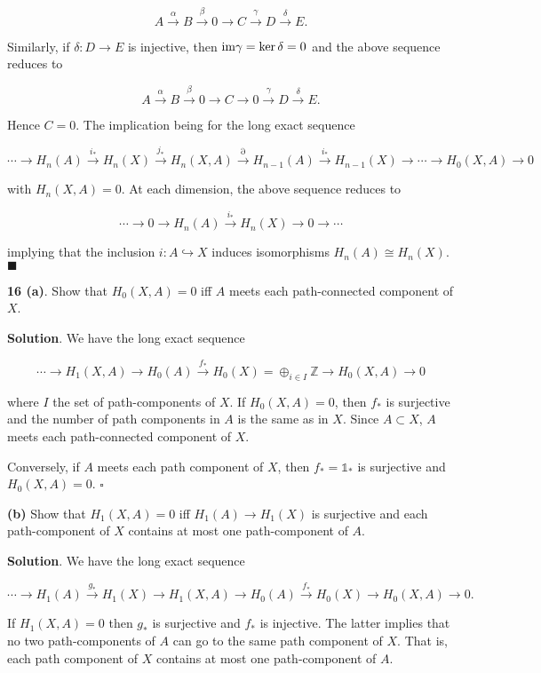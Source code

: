 \documentclass{article}
\newcommand{\Z}{\mathbb{Z}}
\newcommand{\identity}{\mathds{1}}
\newcommand{\im}{\textnormal{im}}
\begin{document}
$$A\xrightarrow{\alpha} B\xrightarrow{\beta} 0\to C\xrightarrow{\gamma} D\xrightarrow{\delta} E.$$

Similarly, if $\delta: D\to E$ is injective, then $\im \gamma = \ker \delta = 0$ and the above sequence reduces to

$$A\xrightarrow{\alpha} B\xrightarrow{\beta} 0\to C\to 0\xrightarrow{\gamma} D\xrightarrow{\delta} E.$$

Hence $C = 0$. The implication being for the long exact sequence

$$\cdots \to H_{n}(A)\xrightarrow{i_{\ast}} H_{n}(X)\xrightarrow{j_{\ast}}H_{n}(X, A)\xrightarrow{\partial} H_{n-1}(A)\xrightarrow{i_{\ast}} H_{n-1}(X)\to \cdots \to H_{0}(X, A)\to 0$$

with $H_{n}(X, A) = 0$. At each dimension, the above sequence reduces to

$$\cdots\to  0\to H_{n}(A)\xrightarrow{i_{\ast}} H_{n}(X)\to 0\to \cdots $$

implying that the inclusion $i: A\hookrightarrow X$ induces isomorphisms $H_{n}(A)\cong H_{n}(X)$. $\blacksquare$
\bigskip
\bigskip

\textbf{16 (a)}. Show that $H_{0}(X, A) = 0$ iff $A$ meets each path-connected component of $X$.
\medskip

\textbf{Solution}. We have the long exact sequence

$$\cdots \to H_{1}(X, A)\to H_{0}(A)\xrightarrow{f_{\ast}} H_{0}(X) = \oplus_{i\in I} \Z\to H_{0}(X, A)\to 0$$

where $I$ the set of path-components of $X$. If $H_{0}(X, A) = 0$, then $f_{\ast}$ is surjective and the number of path components in $A$ is the same as in $X$. Since $A\subset X$, $A$ meets each path-connected component of $X$. 
\medskip

Conversely, if $A$ meets each path component of $X$, then $f_{\ast} = \identity_{\ast}$ is surjective and $H_{0}(X, A) = 0$. $\square$
\medskip

\textbf{(b)} Show that $H_{1}(X, A) = 0$ iff $H_{1}(A)\to H_{1}(X)$ is surjective and each path-component of $X$ contains at most one path-component of $A$.
\medskip

\textbf{Solution}. We have the long exact sequence

$$\cdots \to H_{1}(A)\xrightarrow{g_{\ast}} H_{1}(X)\to H_{1}(X, A)\to H_{0}(A)\xrightarrow{f_{\ast}} H_{0}(X)\to H_{0}(X, A)\to 0.$$

If $H_{1}(X, A) = 0$ then $g_{\ast}$ is surjective and $f_{\ast}$ is injective. The latter implies that no two path-components of $A$ can go to the same path component of $X$. That is, each path component of $X$ contains at most one path-component of $A$.
\medskip
\end{document}
